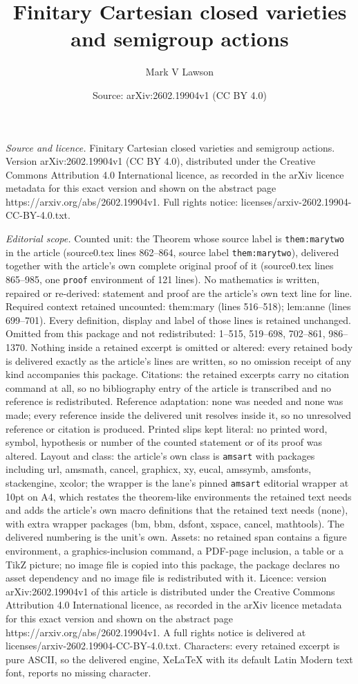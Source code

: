 \documentclass[10pt,a4paper]{amsart}
\title[Finitary Cartesian closed varieties and semigroup actions]{Finitary Cartesian closed varieties and semigroup actions}
\author{Mark V Lawson}
\date{Source: arXiv:2602.19904v1 (CC BY 4.0)}
\begin{document}
\maketitle

\noindent\emph{Source and licence.} Finitary Cartesian closed varieties and semigroup actions. Version arXiv:2602.19904v1 (CC BY 4.0), distributed under the Creative Commons Attribution 4.0 International licence, as recorded in the arXiv licence metadata for this exact version and shown on the abstract page https://arxiv.org/abs/2602.19904v1. Full rights notice: licenses/arxiv-2602.19904-CC-BY-4.0.txt.\par\smallskip

\noindent\textit{Editorial scope.} Counted unit: the Theorem whose source label is \texttt{them:marytwo} in the article (source0.tex lines 862--864, source label \texttt{them:marytwo}), delivered together with the article's own complete original proof of it (source0.tex lines 865--985, one \texttt{proof} environment of 121 lines). No mathematics is written, repaired or re-derived: statement and proof are the article's own text line for line. Required context retained uncounted: them:mary (lines 516--518); lem:anne (lines 699--701). Every definition, display and label of those lines is retained unchanged. Omitted from this package and not redistributed: 1--515, 519--698, 702--861, 986--1370. Nothing inside a retained excerpt is omitted or altered: every retained body is delivered exactly as the article's lines are written, so no omission receipt of any kind accompanies this package. Citations: the retained excerpts carry no citation command at all, so no bibliography entry of the article is transcribed and no reference is redistributed. Reference adaptation: none was needed and none was made; every reference inside the delivered unit resolves inside it, so no unresolved reference or citation is produced. Printed slips kept literal: no printed word, symbol, hypothesis or number of the counted statement or of its proof was altered. Layout and class: the article's own class is \texttt{amsart} with packages including url, amsmath, cancel, graphicx, xy, eucal, amssymb, amsfonts, stackengine, xcolor; the wrapper is the lane's pinned \texttt{amsart} editorial wrapper at 10pt on A4, which restates the theorem-like environments the retained text needs and adds the article's own macro definitions that the retained text needs (none), with extra wrapper packages (bm, bbm, dsfont, xspace, cancel, mathtools). The delivered numbering is the unit's own. Assets: no retained span contains a figure environment, a graphics-inclusion command, a PDF-page inclusion, a table or a TikZ picture; no image file is copied into this package, the package declares no asset dependency and no image file is redistributed with it. Licence: version arXiv:2602.19904v1 of this article is distributed under the Creative Commons Attribution 4.0 International licence, as recorded in the arXiv licence metadata for this exact version and shown on the abstract page https://arxiv.org/abs/2602.19904v1. A full rights notice is delivered at licenses/arxiv-2602.19904-CC-BY-4.0.txt. Characters: every retained excerpt is pure ASCII, so the delivered engine, XeLaTeX with its default Latin Modern text font, reports no missing character.
\end{document}
